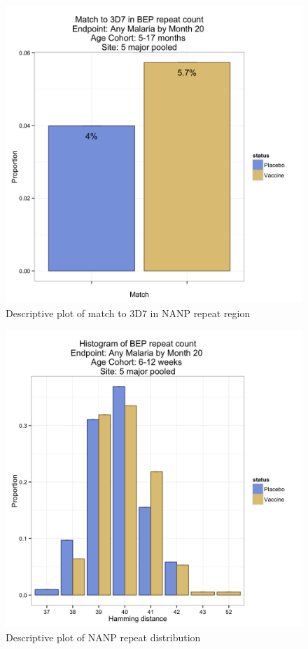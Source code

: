 \documentclass[]{article}
\begin{document}
\begin{figure}[htbp]
\centering
\includegraphics{figures/bep-match-infact-x-1.png}
\caption{Descriptive plot of match to 3D7 in NANP repeat region}
\end{figure}

\begin{figure}[htbp]
\centering
\includegraphics{figures/bep-hist-newborn-x-1.png}
\caption{Descriptive plot of NANP repeat distribution}
\end{figure}
\end{document}
